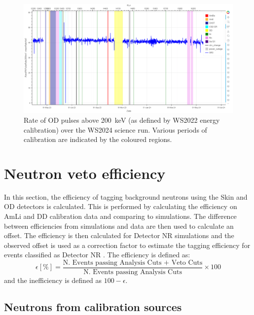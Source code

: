 \begin{figure}[!ht]
	\centering
	\includegraphics[width=\textwidth]{figures/VetoEfficiency/prem_od_stability.png}
	\caption{Rate of OD pulses above 200~keV (as defined by WS2022 energy calibration) over the WS2024 science run. Various periods of calibration are indicated by the coloured regions.}
	\label{fig:VetoEff/deadtime_stability_prem}
\end{figure}

\section{Neutron veto efficiency}\label{sec:VetoEff/efficiency}
In this section, the efficiency of tagging background neutrons using the Skin and OD detectors is calculated.
This is performed by calculating the efficiency on AmLi and DD calibration data and comparing to simulations.
The difference between efficiencies from simulations and data are then used to calculate an offset.
The efficiency is then calculated for Detector NR simulations and the observed offset is used as a correction factor to estimate the tagging efficiency for events classified as Detector NR \cite{LZ:2022ysc,LZ:2024zvo}.
The efficiency is defined as:
\begin{equation}\label{eqn:VetoEff/:neutron_tagging_efficiency}
	\epsilon [\%] = \frac{\textrm{N. Events passing Analysis Cuts + Veto Cuts}}{\textrm{N. Events passing Analysis Cuts}} \times 100
\end{equation}
and the inefficiency is defined as $100 - \epsilon$.

\subsection{Neutrons from calibration sources \label{sec:VetoEff/AmLi_Efficiency}}
